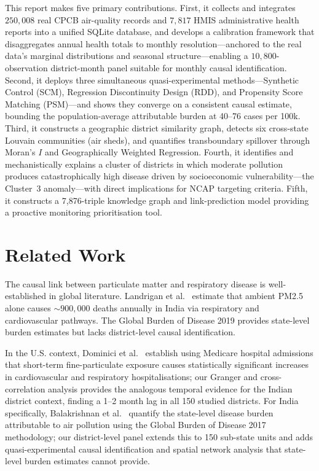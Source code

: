\documentclass{article}
\begin{document}
This report makes five primary contributions. First, it collects and integrates $250{,}008$
real CPCB air-quality records and $7{,}817$ HMIS administrative health reports into a
unified SQLite database, and develops a calibration framework that disaggregates annual
health totals to monthly resolution---anchored to the real data's marginal distributions
and seasonal structure---enabling a $10{,}800$-observation district-month panel suitable
for monthly causal identification. Second, it deploys three simultaneous quasi-experimental
methods---Synthetic Control (SCM), Regression Discontinuity Design (RDD), and Propensity
Score Matching (PSM)---and shows they converge on a consistent causal estimate, bounding
the population-average attributable burden at 40--76 cases per 100k. Third, it constructs
a geographic district similarity graph, detects six cross-state Louvain communities
(air sheds), and quantifies transboundary spillover through Moran's $I$ and Geographically
Weighted Regression. Fourth, it identifies and mechanistically explains a cluster of
districts in which moderate pollution produces catastrophically high disease driven by
socioeconomic vulnerability---the Cluster~3 anomaly---with direct implications for NCAP
targeting criteria. Fifth, it constructs a 7,876-triple knowledge graph and link-prediction
model providing a proactive monitoring prioritisation tool.

\section{Related Work}
\label{sec:related}

The causal link between particulate matter and respiratory disease is well-established in
global literature. Landrigan et al.~\cite{landrigan2018} estimate that ambient PM2.5 alone
causes ${\sim}900{,}000$ deaths annually in India via respiratory and cardiovascular
pathways. The Global Burden of Disease 2019 \cite{gbd2019} provides state-level burden
estimates but lacks district-level causal identification.

In the U.S. context, Dominici et al.~\cite{dominici2006} establish using Medicare hospital
admissions that short-term fine-particulate exposure causes statistically significant
increases in cardiovascular and respiratory hospitalisations; our Granger and cross-correlation
analysis provides the analogous temporal evidence for the Indian district context, finding a
1--2 month lag in all 150 studied districts. For India specifically, Balakrishnan et
al.~\cite{balakrishnan2019} quantify the state-level disease burden attributable to air
pollution using the Global Burden of Disease 2017 methodology; our district-level panel
extends this to 150 sub-state units and adds quasi-experimental causal identification and
spatial network analysis that state-level burden estimates cannot provide.
\end{document}
